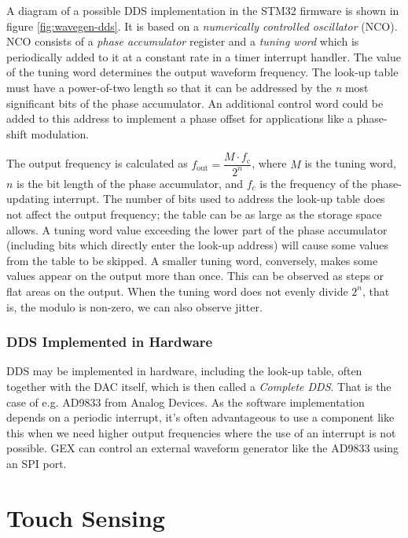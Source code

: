 A diagram of a possible DDS implementation in the STM32 firmware is shown in figure \ref{fig:wavegen-dds}. It is based on a \textit{numerically controlled oscillator} (NCO). NCO consists of a \textit{phase accumulator} register and a \textit{tuning word} which is periodically added to it at a constant rate in a timer interrupt handler. The value of the tuning word determines the output waveform frequency. The look-up table must have a power-of-two length so that it can be addressed by the \textit{n} most significant bits of the phase accumulator. An additional control word could be added to this address to implement a phase offset for applications like a phase-shift modulation.

The output frequency is calculated as \(f_\mathrm{out} = \dfrac{M\cdot f_\mathrm{c}}{2^n}\), where $M$ is the tuning word, $n$ is the bit length of the phase accumulator, and $f_c$ is the frequency of the phase-updating interrupt. The number of bits used to address the look-up table does not affect the output frequency; the table can be as large as the storage space allows. A tuning word value exceeding the lower part of the phase accumulator (including bits which directly enter the look-up address) will cause some values from the table to be skipped. A smaller tuning word, conversely, makes some values appear on the output more than once. This can be observed as steps or flat areas on the output. When the tuning word does not evenly divide $2^n$, that is, the modulo is non-zero, we can also observe jitter.

\subsubsection{DDS Implemented in Hardware}

DDS may be implemented in hardware, including the look-up table, often together with the DAC itself, which is then called a \textit{Complete DDS}. That is the case of e.g. AD9833 from Analog Devices. As the software implementation depends on a periodic interrupt, it's often advantageous to use a component like this when we need higher output frequencies where the use of an interrupt is not possible. GEX can control an external waveform generator like the AD9833 using an SPI port.

\section{Touch Sensing} \label{sec:theory-touch}

